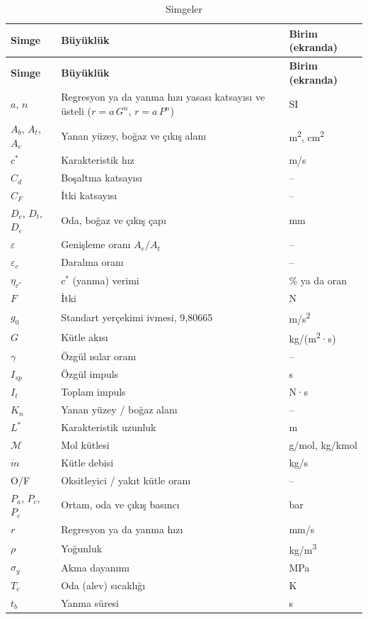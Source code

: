\documentclass[11pt,a4paper]{article}
\begin{document}
\begin{longtable}{@{}>{\raggedright\arraybackslash}p{2.4cm}>{\raggedright\arraybackslash}p{8.8cm}>{\raggedright\arraybackslash}p{4.4cm}@{}}
\caption{Simgeler}\label{tab:simge}\\
\toprule
\textbf{Simge} & \textbf{Büyüklük} & \textbf{Birim (ekranda)} \\
\midrule\endfirsthead
\toprule
\textbf{Simge} & \textbf{Büyüklük} & \textbf{Birim (ekranda)} \\
\midrule\endhead
\bottomrule\endlastfoot
$a$, $n$ & Regresyon ya da yanma hızı yasası katsayısı ve üsteli ($r = a\,G^n$, $r = a\,P^n$) & SI \\
$A_b$, $A_t$, $A_e$ & Yanan yüzey, boğaz ve çıkış alanı & m\textsuperscript{2}, cm\textsuperscript{2} \\
$c^*$ & Karakteristik hız & m/s \\
$C_d$ & Boşaltma katsayısı & -- \\
$C_F$ & İtki katsayısı & -- \\
$D_c$, $D_t$, $D_e$ & Oda, boğaz ve çıkış çapı & mm \\
$\varepsilon$ & Genişleme oranı $A_e/A_t$ & -- \\
$\varepsilon_c$ & Daralma oranı & -- \\
$\eta_{c^*}$ & $c^*$ (yanma) verimi & \% ya da oran \\
$F$ & İtki & N \\
$g_0$ & Standart yerçekimi ivmesi, 9,80665 & m/s\textsuperscript{2} \\
$G$ & Kütle akısı & kg/(m\textsuperscript{2}·s) \\
$\gamma$ & Özgül ısılar oranı & -- \\
$I_{sp}$ & Özgül impuls & s \\
$I_t$ & Toplam impuls & N·s \\
$K_n$ & Yanan yüzey / boğaz alanı & -- \\
$L^*$ & Karakteristik uzunluk & m \\
$\mathcal{M}$ & Mol kütlesi & g/mol, kg/kmol \\
$\dot m$ & Kütle debisi & kg/s \\
O/F & Oksitleyici / yakıt kütle oranı & -- \\
$P_a$, $P_c$, $P_e$ & Ortam, oda ve çıkış basıncı & bar \\
$r$ & Regresyon ya da yanma hızı & mm/s \\
$\rho$ & Yoğunluk & kg/m\textsuperscript{3} \\
$\sigma_y$ & Akma dayanımı & MPa \\
$T_c$ & Oda (alev) sıcaklığı & K \\
$t_b$ & Yanma süresi & s \\
\end{longtable}
\end{document}

